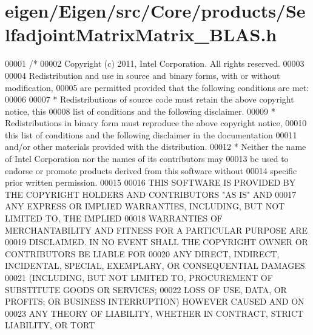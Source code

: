 \hypertarget{eigen_2_eigen_2src_2_core_2products_2_selfadjoint_matrix_matrix___b_l_a_s_8h_source}{}\section{eigen/\+Eigen/src/\+Core/products/\+Selfadjoint\+Matrix\+Matrix\+\_\+\+B\+L\+AS.h}
\label{eigen_2_eigen_2src_2_core_2products_2_selfadjoint_matrix_matrix___b_l_a_s_8h_source}

\begin{DoxyCode}
00001 \textcolor{comment}{/*}
00002 \textcolor{comment}{ Copyright (c) 2011, Intel Corporation. All rights reserved.}
00003 \textcolor{comment}{}
00004 \textcolor{comment}{ Redistribution and use in source and binary forms, with or without modification,}
00005 \textcolor{comment}{ are permitted provided that the following conditions are met:}
00006 \textcolor{comment}{}
00007 \textcolor{comment}{ * Redistributions of source code must retain the above copyright notice, this}
00008 \textcolor{comment}{   list of conditions and the following disclaimer.}
00009 \textcolor{comment}{ * Redistributions in binary form must reproduce the above copyright notice,}
00010 \textcolor{comment}{   this list of conditions and the following disclaimer in the documentation}
00011 \textcolor{comment}{   and/or other materials provided with the distribution.}
00012 \textcolor{comment}{ * Neither the name of Intel Corporation nor the names of its contributors may}
00013 \textcolor{comment}{   be used to endorse or promote products derived from this software without}
00014 \textcolor{comment}{   specific prior written permission.}
00015 \textcolor{comment}{}
00016 \textcolor{comment}{ THIS SOFTWARE IS PROVIDED BY THE COPYRIGHT HOLDERS AND CONTRIBUTORS "AS IS" AND}
00017 \textcolor{comment}{ ANY EXPRESS OR IMPLIED WARRANTIES, INCLUDING, BUT NOT LIMITED TO, THE IMPLIED}
00018 \textcolor{comment}{ WARRANTIES OF MERCHANTABILITY AND FITNESS FOR A PARTICULAR PURPOSE ARE}
00019 \textcolor{comment}{ DISCLAIMED. IN NO EVENT SHALL THE COPYRIGHT OWNER OR CONTRIBUTORS BE LIABLE FOR}
00020 \textcolor{comment}{ ANY DIRECT, INDIRECT, INCIDENTAL, SPECIAL, EXEMPLARY, OR CONSEQUENTIAL DAMAGES}
00021 \textcolor{comment}{ (INCLUDING, BUT NOT LIMITED TO, PROCUREMENT OF SUBSTITUTE GOODS OR SERVICES;}
00022 \textcolor{comment}{ LOSS OF USE, DATA, OR PROFITS; OR BUSINESS INTERRUPTION) HOWEVER CAUSED AND ON}
00023 \textcolor{comment}{ ANY THEORY OF LIABILITY, WHETHER IN CONTRACT, STRICT LIABILITY, OR TORT}

\end{DoxyCode}
